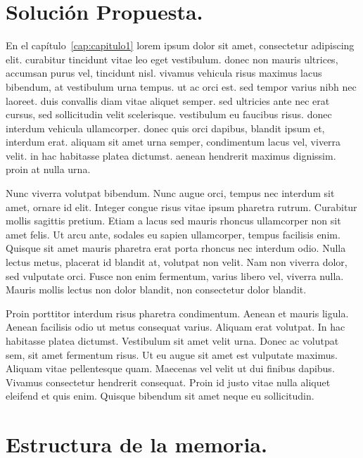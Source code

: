 \section*{Solución Propuesta.}


En el capítulo~\ref{cap:capitulo1} lorem ipsum dolor sit amet, consectetur adipiscing elit. curabitur tincidunt vitae leo eget vestibulum. donec non mauris ultrices, accumsan purus vel, tincidunt nisl. vivamus vehicula risus maximus lacus bibendum, at vestibulum urna tempus. ut ac orci est. sed tempor varius nibh nec laoreet. duis convallis diam vitae aliquet semper. sed ultricies ante nec erat cursus, sed sollicitudin velit scelerisque. vestibulum eu faucibus risus. donec interdum vehicula ullamcorper. donec quis orci dapibus, blandit ipsum et, interdum erat. aliquam sit amet urna semper, condimentum lacus vel, viverra velit. in hac habitasse platea dictumst. aenean hendrerit maximus dignissim. proin at nulla urna.


Nunc viverra volutpat bibendum. Nunc augue orci, tempus nec interdum sit amet, ornare id elit. Integer congue risus vitae ipsum pharetra rutrum. Curabitur mollis sagittis pretium. Etiam a lacus sed mauris rhoncus ullamcorper non sit amet felis. Ut arcu ante, sodales eu sapien ullamcorper, tempus facilisis enim. Quisque sit amet mauris pharetra erat porta rhoncus nec interdum odio. Nulla lectus metus, placerat id blandit at, volutpat non velit. Nam non viverra dolor, sed vulputate orci. Fusce non enim fermentum, varius libero vel, viverra nulla. Mauris mollis lectus non dolor blandit, non consectetur dolor blandit.

Proin porttitor interdum risus pharetra condimentum. Aenean et mauris ligula. Aenean facilisis odio ut metus consequat varius. Aliquam erat volutpat. In hac habitasse platea dictumst. Vestibulum sit amet velit urna. Donec ac volutpat sem, sit amet fermentum risus. Ut eu augue sit amet est vulputate maximus. Aliquam vitae pellentesque quam. Maecenas vel velit ut dui finibus dapibus. Vivamus consectetur hendrerit consequat. Proin id justo vitae nulla aliquet eleifend et quis enim. Quisque bibendum sit amet neque eu sollicitudin.




\section*{Estructura de la memoria.}

